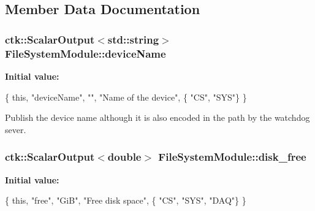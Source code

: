 \subsection{Member Data Documentation}
\subsubsection[{\texorpdfstring{device\+Name}{deviceName}}]{\setlength{\rightskip}{0pt plus 5cm}ctk\+::\+Scalar\+Output$<$std\+::string$>$ File\+System\+Module\+::device\+Name}\hypertarget{structFileSystemModule_a1f0d9c5b8ee4bf06a7ea0d5cb0205eeb}{}\label{structFileSystemModule_a1f0d9c5b8ee4bf06a7ea0d5cb0205eeb}
{\bfseries Initial value\+:}
\begin{DoxyCode}
\{ \textcolor{keyword}{this}, \textcolor{stringliteral}{"deviceName"}, \textcolor{stringliteral}{""}, \textcolor{stringliteral}{"Name of the device"},
        \{ \textcolor{stringliteral}{"CS"}, \textcolor{stringliteral}{"SYS"}\} \}
\end{DoxyCode}
Publish the device name although it is also encoded in the path by the watchdog sever. 
\subsubsection[{\texorpdfstring{disk\+\_\+free}{disk_free}}]{\setlength{\rightskip}{0pt plus 5cm}ctk\+::\+Scalar\+Output$<$double$>$ File\+System\+Module\+::disk\+\_\+free}\hypertarget{structFileSystemModule_a11fea9c13f63fd00198a5c5ed4ca5f14}{}\label{structFileSystemModule_a11fea9c13f63fd00198a5c5ed4ca5f14}
{\bfseries Initial value\+:}
\begin{DoxyCode}
\{ \textcolor{keyword}{this}, \textcolor{stringliteral}{"free"}, \textcolor{stringliteral}{"GiB"}, \textcolor{stringliteral}{"Free disk space"},
          \{ \textcolor{stringliteral}{"CS"}, \textcolor{stringliteral}{"SYS"}, \textcolor{stringliteral}{"DAQ"}\} \}
\end{DoxyCode}
